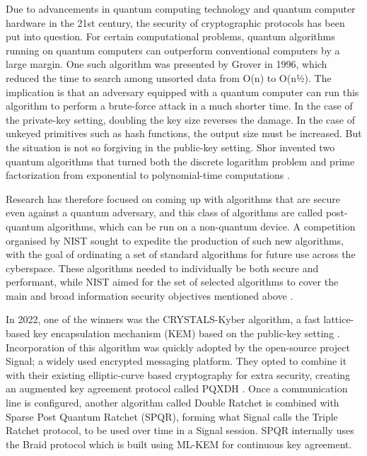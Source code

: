 Due to advancements in quantum computing technology and quantum computer hardware in the 21st century, the security of cryptographic protocols has been put into question. For certain computational problems, quantum algorithms running on quantum computers can outperform conventional computers by a large margin. One such algorithm was presented by Grover in 1996, which reduced the time to search among unsorted data from O(n) to O(n½). The implication is that an adversary equipped with a quantum computer can run this algorithm to perform a brute-force attack in a much shorter time. In the case of the private-key setting, doubling the key size reverses the damage. In the case of unkeyed primitives such as hash functions, the output size must be increased. But the situation is not so forgiving in the public-key setting. Shor invented two quantum algorithms that turned both the discrete logarithm problem and prime factorization from exponential to polynomial-time computations \cite{ref06}. 

 

Research has therefore focused on coming up with algorithms that are secure even against a quantum adversary, and this class of algorithms are called post-quantum algorithms, which can be run on a non-quantum device. A competition organised by NIST sought to expedite the production of such new algorithms, with the goal of ordinating a set of standard algorithms for future use across the cyberspace. These algorithms needed to individually be both secure and performant, while NIST aimed for the set of selected algorithms to cover the main and broad information security objectives mentioned above \cite{ref06}.

 

In 2022, one of the winners was the CRYSTALS-Kyber algorithm, a fast lattice-based key encapsulation mechanism (KEM) based on the public-key setting \cite{ref06}. Incorporation of this algorithm was quickly adopted by the open-source project Signal; a widely used encrypted messaging platform. They opted to combine it with their existing elliptic-curve based cryptography for extra security, creating an augmented key agreement protocol called PQXDH \cite{ref07}. Once a communication line is configured, another algorithm called Double Ratchet is combined with Sparse Post Quantum Ratchet (SPQR), forming what Signal calls the Triple Ratchet protocol, to be used over time in a Signal session. SPQR internally uses the Braid protocol which is built using ML-KEM for continuous key agreement.  

